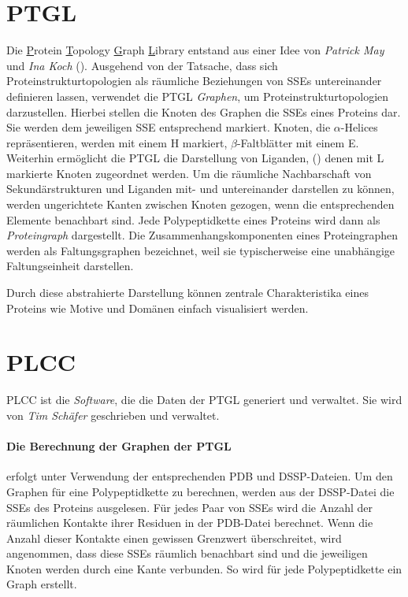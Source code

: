 \documentclass{report}
\begin{document}
\section{PTGL}


Die \underline{P}rotein \underline{T}opology \underline{G}raph \underline{L}ibrary entstand aus einer Idee von \textit{Patrick May} und \textit{Ina Koch} (\cite{ptgl1}). Ausgehend von der Tatsache, dass sich Proteinstrukturtopologien als r\"aumliche Beziehungen von SSEs untereinander definieren lassen, verwendet die PTGL \emph{Graphen}, um Proteinstrukturtopologien darzustellen.
Hierbei stellen die Knoten des Graphen die SSEs eines Proteins dar. Sie werden dem jeweiligen SSE entsprechend markiert. Knoten, die $\alpha$-Helices repr\"asentieren, werden mit einem H markiert, $\beta$-Faltbl\"atter mit einem E. Weiterhin erm\"oglicht die PTGL die Darstellung von Liganden, (\cite{vplg}) denen mit L markierte Knoten zugeordnet werden. Um die r\"aumliche Nachbarschaft von Sekund\"arstrukturen und Liganden mit- und untereinander darstellen zu k\"onnen, werden ungerichtete Kanten zwischen Knoten gezogen, wenn die entsprechenden Elemente benachbart sind. Jede Polypeptidkette eines Proteins wird dann als \emph{Proteingraph} dargestellt. Die Zusammenhangskomponenten eines Proteingraphen werden als Faltungsgraphen bezeichnet, weil sie typischerweise eine unabh\"angige Faltungseinheit darstellen.

Durch diese abstrahierte Darstellung k\"onnen zentrale Charakteristika eines Proteins wie Motive und Dom\"anen einfach visualisiert werden.


\section{PLCC}

PLCC ist die \textit{Software}, die die Daten der PTGL generiert und verwaltet. Sie wird von \textit{Tim Sch\"afer} geschrieben und verwaltet.


\paragraph{Die Berechnung der Graphen der PTGL}

erfolgt unter Verwendung der entsprechenden PDB und DSSP-Dateien. Um den Graphen f\"ur eine Polypeptidkette zu berechnen, werden aus der DSSP-Datei die SSEs des Proteins ausgelesen. F\"ur jedes Paar von SSEs wird die Anzahl der r\"aumlichen Kontakte ihrer Residuen in der PDB-Datei berechnet. Wenn die Anzahl dieser Kontakte einen gewissen Grenzwert \"uberschreitet, wird angenommen, dass diese SSEs r\"aumlich benachbart sind und die jeweiligen Knoten werden durch eine Kante verbunden. So wird f\"ur jede Polypeptidkette ein Graph erstellt.
\end{document}
